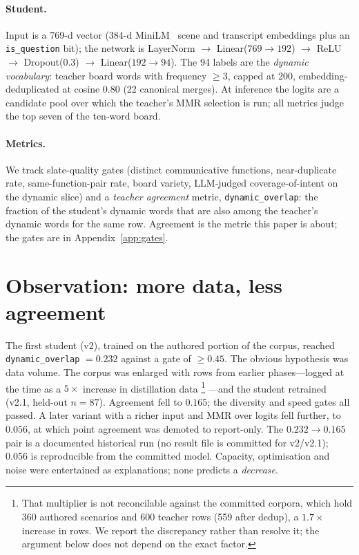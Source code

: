 \documentclass{article}
\begin{document}
\paragraph{Student.} Input is a 769-d vector (384-d MiniLM~\citep{minilm}
scene and transcript embeddings plus an \texttt{is\_question} bit); the network
is LayerNorm $\to$ Linear($769{\to}192$) $\to$ ReLU $\to$ Dropout(0.3) $\to$
Linear($192{\to}94$). The 94 labels are the \emph{dynamic vocabulary}: teacher
board words with frequency $\ge3$, capped at 200, embedding-deduplicated at
cosine 0.80 (22 canonical merges). At inference the logits are a candidate
pool over which the teacher's MMR selection is run; all metrics judge the top
seven of the ten-word board.

\paragraph{Metrics.} We track slate-quality gates (distinct communicative
functions, near-duplicate rate, same-function-pair rate, board variety,
LLM-judged coverage-of-intent on the dynamic slice) and a \emph{teacher
agreement} metric, \texttt{dynamic\_overlap}: the fraction of the student's
dynamic words that are also among the teacher's dynamic words for the same
row. Agreement is the metric this paper is about; the gates are in
Appendix~\ref{app:gates}.

\section{Observation: more data, less agreement}
\label{sec:obs}
The first student (v2), trained on the authored portion of the corpus,
reached \texttt{dynamic\_overlap} $=0.232$ against a gate of $\ge 0.45$. The
obvious hypothesis was data volume. The corpus was enlarged with rows from
earlier phases---logged at the time as a $5\times$ increase in distillation
data%
\footnote{That multiplier is not reconcilable against the committed corpora,
which hold 360 authored scenarios and 600 teacher rows (559 after dedup), a
$1.7\times$ increase in rows. We report the discrepancy rather than resolve it;
the argument below does not depend on the exact factor.}%
---and the student retrained (v2.1, held-out $n=87$). Agreement fell to
$0.165$; the diversity and speed gates all passed. A later variant with a
richer input and MMR over logits fell further, to $0.056$, at which point
agreement was demoted to report-only. The $0.232\to0.165$ pair is a
documented historical run (no result file is committed for v2/v2.1); 0.056 is
reproducible from the committed model. Capacity, optimisation and noise were entertained as explanations; none
predicts a \emph{decrease}.
\end{document}
